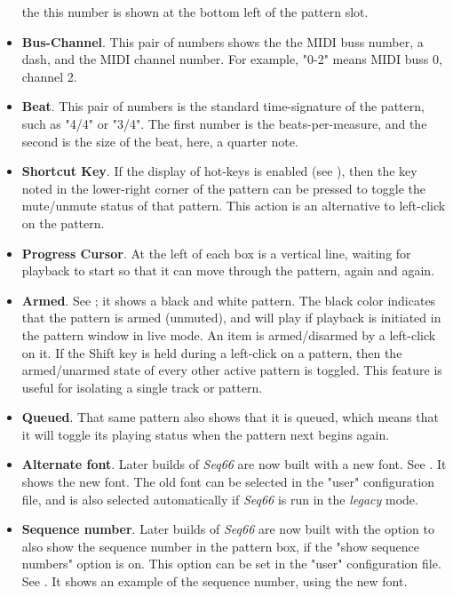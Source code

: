 \begin{itemize}
         the this number is shown at the bottom left of the pattern slot.
      \item \textbf{Bus-Channel}.
         This pair of numbers shows the the MIDI buss number, a dash, and
         the MIDI channel number.
         For example, "0-2" means MIDI buss 0, channel 2.
      \item \textbf{Beat}.
         This pair of numbers is the standard time-signature of the pattern,
         such as "4/4" or "3/4".  The first number is the beats-per-measure,
         and the second is the size of the beat, here, a quarter note.
      \item \textbf{Shortcut Key}.
         If the display of hot-keys is enabled (see
         ),
         then the key noted in the lower-right corner of the pattern can be
         pressed to toggle the mute/unmute status of that pattern.
         This action is an alternative to left-click on the pattern.
      \item \textbf{Progress Cursor}.
         At the left of each box is a vertical line, waiting for playback to
         start so that it can move through the pattern, again and again.
      \item \textbf{Armed}.
         See ; it shows a black
         and white pattern.  The black color indicates that the pattern is armed
         (unmuted), and will play if playback is initiated in the pattern
         window in live mode.
         An item is armed/disarmed by a left-click on it.
         If the Shift key is held during a left-click on a pattern, then
         the armed/unarmed state of every other active pattern is toggled.
         This feature is useful for isolating a single track or pattern.
      \item \textbf{Queued}.
         That same pattern also shows that it is queued, which means that it
         will toggle its playing status when the pattern next begins again.
      \item \textbf{Alternate font}.
         Later builds of \textsl{Seq66} are now built with a new font.
         See .  It shows the new
         font. 
         The old font can be selected in the "user" configuration file, and is
         also selected automatically if \textsl{Seq66} is run in the
         \textsl{legacy} mode.
      \item \textbf{Sequence number}.
         Later builds of \textsl{Seq66} are now built with the option to
         also show the sequence number in the pattern box, if the "show
         sequence numbers" option is on.
         This option can be set in the "user" configuration file.
         See .  It shows an
         example of the sequence number, using the new font.
   \end{itemize}

